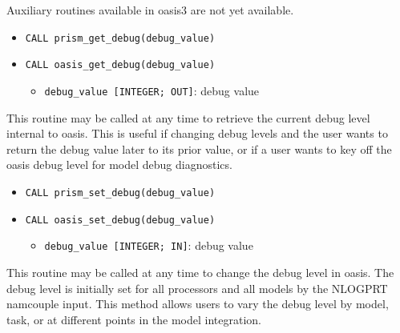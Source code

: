 Auxiliary routines available in oasis3 are not yet available.

\begin{itemize} 
\item {\tt CALL prism\_get\_debug(debug\_value)}
\item {\tt CALL oasis\_get\_debug(debug\_value)}
\begin{itemize}
\item {\tt debug\_value [INTEGER; OUT]}: debug value
\end{itemize}
\end{itemize}

This routine may be called at any time to retrieve the current
debug level internal to oasis.  This is useful if changing debug
levels and the user wants to return the debug value later to
its prior value, or if a user wants to key off the oasis
debug level for model debug diagnostics.


\begin{itemize} 
\item {\tt CALL prism\_set\_debug(debug\_value)}
\item {\tt CALL oasis\_set\_debug(debug\_value)}
\begin{itemize}
\item {\tt debug\_value [INTEGER; IN]}: debug value
\end{itemize}
\end{itemize}

This routine may be called at any time to change the debug level in oasis.
The debug level is initially set for all processors and all models
by the NLOGPRT namcouple input.  This method allows users to vary 
the debug level by model, task, or at different points in the model
integration.


